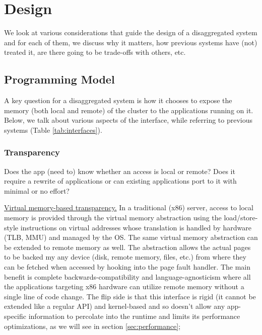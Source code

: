 
\section{Design}
\label{sec:design}
We look at various considerations that guide the design of a 
disaggregated system and for each of them, we discuss why it 
matters, how previous systems have (not) treated it, are there 
going to be trade-offs with others, etc. 

\subsection{Programming Model}
A key question for a disaggregated system is how it 
chooses to expose the memory (both local and remote) of the 
cluster to the applications running on it. Below, we talk about 
various aspects of the interface, while referring to 
previous systems (Table \ref{tab:interfaces}).

\subsubsection{Transparency}
Does the app (need to) know whether an access is local or 
remote? Does it require a rewrite of applications or can 
existing applications port to it with minimal or no effort?

\vspace{3pt}
\noindent \uline{Virtual memory-based transparency.}
In a traditional (x86) server, access to local memory is 
provided through the virtual memory abstraction using 
the load/store-style instructions on virtual addresses 
whose translation is handled by hardware (TLB, MMU) and 
managed by the OS. The same virtual memory abstraction can 
be extended to remote memory as well. The abstraction 
allows the actual pages to be backed my any device 
(disk, remote memory, files, etc.) from where they can 
be fetched when accessed by hooking into the page fault 
handler. The main benefit is complete backwards-compatibility 
and language-agnosticism where all the applications 
targeting x86 hardware can utilize  
remote memory without a single line of code change. The flip side 
is that this interface is rigid (it cannot be extended like a
regular API) and kernel-based and so doesn't allow any 
app-specific information to percolate into the runtime and 
limits its performance optimizations, as we will see in 
section \ref{sec:performance};


